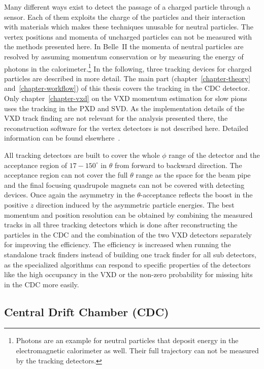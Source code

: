 Many different ways exist to detect the passage of a charged particle through a sensor. Each of them exploits the charge of the particles and their interaction with materials which makes these techniques unusable for neutral particles. The vertex positions and momenta of uncharged particles can not be measured with the methods presented here. In Belle~II the momenta of neutral particles are resolved by assuming momentum conservation or by measuring the energy of photons in the calorimeter.\footnote{Photons are an example for neutral particles that deposit energy in the electromagnetic calorimeter as well. Their full trajectory can not be measured by the tracking detectors.} In the following, three tracking devices for charged particles are described in more detail. The main part (chapter~\ref{chapter-theory} and~\ref{chapter-workflow}) of this thesis covers the tracking in the CDC detector. Only chapter~\ref{chapter-vxd} on the VXD momentum estimation for slow pions uses the tracking in the PXD and SVD. As the implementation details of the VXD track finding are not relevant for the analysis presented there, the reconstruction software for the vertex detectors is not described here. Detailed information can be found elsewhere~\cite{jakob}.

All tracking detectors are built to cover the whole $\phi$ range of the detector and the acceptance region of $17-150 ^\circ$ in $\theta$ from forward to backward direction. The acceptance region can not cover the full $\theta$ range as the space for the beam pipe and the final focusing quadrupole magnets can not be covered with detecting devices. Once again the asymmetry in the $\theta$-acceptance reflects the boost in the positive $z$ direction induced by the asymmetric particle energies. The best momentum and position resolution can be obtained by combining the measured tracks in all three tracking detectors which is done after reconstructing the particles in the CDC and the combination of the two VXD detectors separately for improving the efficiency. The efficiency is increased when running the standalone track finders instead of building one track finder for all sub detectors, as the specialized algorithms can respond to specific properties of the detectors like the high occupancy in the VXD or the non-zero probability for missing hits in the CDC more easily. 

\subsection{Central Drift Chamber (CDC)}


